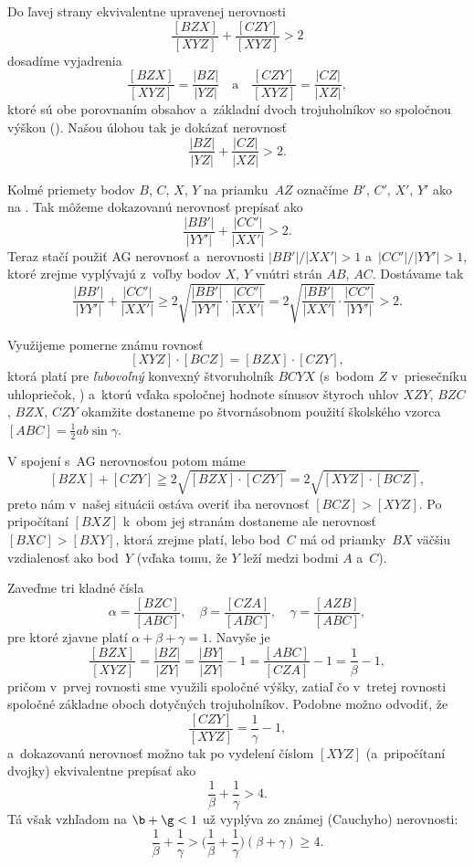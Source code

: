 {%
Do ľavej strany ekvivalentne upravenej nerovnosti
$$
\frac{[BZX]}{[XYZ]}+\frac{[CZY]}{[XYZ]}>2
$$
dosadíme vyjadrenia
$$
\frac{[BZX]}{[XYZ]}=\frac{|BZ|}{|YZ|} \quad\text{a}\quad
\frac{[CZY]}{[XYZ]}=\frac{|CZ|}{|XZ|},
$$
ktoré sú obe porovnaním obsahov a~základní
dvoch trojuholníkov so spoločnou výškou (\obr). Našou úlohou tak je dokázať nerovnosť
$$
\frac{|BZ|}{|YZ|} + \frac{|CZ|}{|XZ|} > 2.
$$
%

Kolmé priemety bodov $B$, $C$, $X$, $Y$ na priamku~$AZ$ označíme
$B'$, $C'$, $X'$, $Y'$ ako na .
Tak môžeme dokazovanú nerovnosť prepísať ako
$$
\frac{|BB'|}{|YY'|} + \frac{|CC'|}{|XX'|} > 2.
$$
Teraz stačí použiť AG nerovnosť a~nerovnosti $|BB'|/|XX'|>1$
a~$|CC'|/|YY'|>1$, ktoré zrejme vyplývajú z~voľby bodov $X$, $Y$ vnútri strán $AB$,
$AC$. Dostávame tak
$$
\frac{|BB'|}{|YY'|} + \frac{|CC'|}{|XX'|} \ge
2\sqrt{\frac{|BB'|}{|YY'|}\cdot\frac{|CC'|}{|XX'|}}=
2\sqrt{\frac{|BB'|}{|XX'|}\cdot\frac{|CC'|}{|YY'|}}>2.
$$


\ineres
Využijeme pomerne známu rovnosť
$$
[XYZ]\cdot[BCZ]=[BZX]\cdot[CZY],
$$
ktorá platí pre {\it ľubovoľný\/} konvexný štvoruholník $BCYX$
(s~bodom $Z$ v~priesečníku uhlopriečok, ) a~ktorú vďaka spoločnej
hodnote sínusov štyroch uhlov $XZY$, $BZC$, $BZX$, $CZY$ okamžite dostaneme po
štvornásobnom použití školského vzorca $[ABC]=\frac12ab\sin\gamma$.

V spojení s~AG nerovnosťou potom máme
$$
[BZX]+[CZY]\geqq2\sqrt{[BZX]\cdot[CZY]}=2\sqrt{[XYZ]\cdot[BCZ]},
$$
preto nám v~našej situácii ostáva overiť iba nerovnosť
$[BCZ]>[XYZ]$. Po pripočítaní $[BXZ]$ k~obom jej stranám
dostaneme ale nerovnosť $[BXC]>[BXY]$, ktorá zrejme platí,
lebo bod~$C$ má od priamky~$BX$ väčšiu vzdialenosť ako bod~$Y$
(vďaka tomu, že $Y$ leží medzi bodmi $A$ a~$C$).


\ineres
Zaveďme tri kladné čísla
$$
\alpha = \frac{[BZC]}{[ABC]},\quad
\beta = \frac{[CZA]}{[ABC]}, \quad
\gamma = \frac{[AZB]}{[ABC]},
$$
pre ktoré zjavne platí $\alpha + \beta + \gamma = 1$.
Navyše je
$$
\frac{[BZX]}{[XYZ]} = \frac{|BZ|}{|ZY|} = \frac{|BY|}{|ZY|} - 1
=\frac{[ABC]}{[CZA]}-1=\frac{1}{\beta} - 1,
$$
pričom v~prvej rovnosti sme využili spoločné výšky, zatiaľ čo v~tretej
rovnosti spoločné základne oboch dotyčných trojuholníkov.
Podobne možno odvodiť, že
$$
\frac{[CZY]}{[XYZ]} = \frac{1}{\gamma} - 1,
$$
a~dokazovanú nerovnosť možno tak po vydelení číslom $[XYZ]$ (a~pripočítaní
dvojky) ekvivalentne prepísať ako
$$
\frac{1}{\beta} + \frac{1}{\gamma} > 4.
$$
Tá však vzhľadom na $\b+\g<1$ už vyplýva zo známej (Cauchyho)
nerovnosti:
$$
\frac{1}{\beta} + \frac{1}{\gamma} > \Big(\frac{1}{\beta} +
\frac{1}{\gamma}\Big)(\beta + \gamma) \ge 4.
$$
}

